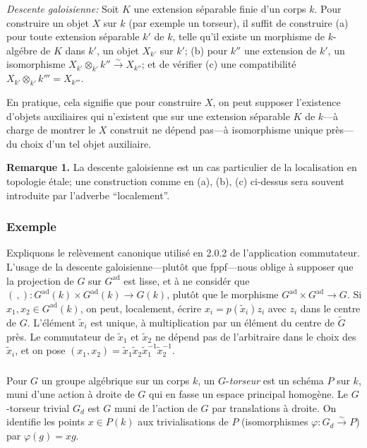\documentclass[12pt,a4paper]{article}
\theoremstyle{plain}
\theoremstyle{definition}
\theoremstyle{remark}
\newcommand{\simto}{\xrightarrow{\sim}}
\begin{document}
\textit{Descente galoisienne:} Soit $K$ une extension s\'eparable finie d'un corps $k$. Pour construire un objet $X$ sur $k$ (par exemple un torseur), il suffit de construire (a) pour toute extension s\'eparable $k'$ de $k$, telle qu'il existe un morphisme de $k$-alg\'ebre de $K$ dans $k'$, un objet $X_{k'}$ sur $k'$; (b) pour $k''$ une extension de $k'$, un isomorphisme $X_{k'} \otimes_{k'} k'' \simto X_{k''}$; et de v\'erifier (c) une compatibilit\'e $X_{k'} \otimes_{k'} k''' = X_{k'''}$.

En pratique, cela signifie que pour construire $X$, on peut supposer l'existence d'objets auxiliaires qui n'existent que sur une extension s\'eparable $K$ de $k$---\`a charge de montrer le $X$ construit ne d\'epend pas---\`a isomorphisme unique pr\`es---du choix d'un tel objet auxiliaire.

\textbf{Remarque 1.} La descente galoisienne est un cas particulier de la localisation en topologie \'etale; une construction comme en (a), (b), (c) ci-dessus sera souvent introduite par l'adverbe ``localement''.

\subsubsection{Exemple}

Expliquons le rel\`evement canonique utilis\'e en 2.0.2 de l'application commutateur. L'usage de la descente galoisienne---plut\^ot que fppf---nous oblige \`a supposer que la projection de $G$ sur $G^{\text{ad}}$ est lisse, et \`a ne consid\'er que $(\,,): G^{\text{ad}}(k) \times G^{\text{ad}}(k) \to G(k)$, plut\^ot que le morphisme $G^{\text{ad}} \times G^{\text{ad}} \to G$. Si $x_1, x_2 \in G^{\text{ad}}(k)$, on peut, localement, \'ecrire $x_i = p(\tilde{x}_i)z_i$ avec $z_i$ dans le centre de $G$. L'\'el\'ement $\tilde{x}_i$ est unique, \`a multiplication par un \'el\'ement du centre de $\tilde{G}$ pr\`es. Le commutateur de $\tilde{x}_1$ et $\tilde{x}_2$ ne d\'epend pas de l'arbitraire dans le choix des $\tilde{x}_i$, et on pose $(x_1,x_2) = \tilde{x}_1\tilde{x}_2\tilde{x}_1^{-1}\tilde{x}_2^{-1}$.

\subsubsection{}

Pour $G$ un groupe alg\'ebrique sur un corps $k$, un $G$-\textit{torseur} est un sch\'ema $P$ sur $k$, muni d'une action \`a droite de $G$ qui en fasse un espace principal homog\`ene. Le $G$-torseur trivial $G_d$ est $G$ muni de l'action de $G$ par translations \`a droite. On identifie les points $x \in P(k)$ aux trivialisations de $P$ (isomorphismes $\varphi: G_d \simto P$) par $\varphi(g) = xg$.
\end{document}
